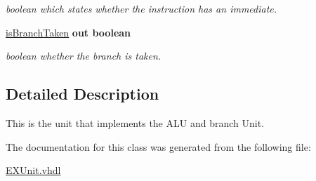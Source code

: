 \begin{DoxyCompactItemize}
\begin{DoxyCompactList}\small\item\em boolean which states whether the instruction has an immediate. \end{DoxyCompactList}\item 
\hypertarget{class_e_x_unit_a0add25d9034509d90a2ac075bc1114c1}{\hyperlink{class_e_x_unit_a0add25d9034509d90a2ac075bc1114c1}{is\-Branch\-Taken}  {\bfseries {\bfseries \textcolor{vhdlkeyword}{out}\textcolor{vhdlchar}{ }}} {\bfseries \textcolor{comment}{boolean}\textcolor{vhdlchar}{ }} }\label{class_e_x_unit_a0add25d9034509d90a2ac075bc1114c1}

\begin{DoxyCompactList}\small\item\em boolean whether the branch is taken. \end{DoxyCompactList}\end{DoxyCompactItemize}


\subsection{Detailed Description}
This is the unit that implements the A\-L\-U and branch Unit. 

The documentation for this class was generated from the following file\-:\begin{DoxyCompactItemize}
\item 
\hyperlink{_e_x_unit_8vhdl}{E\-X\-Unit.\-vhdl}\end{DoxyCompactItemize}
